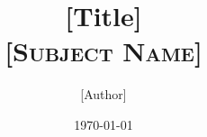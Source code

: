 \documentclass[answers]{exam}
\title{\Huge{[Title]}
	\\
\Large\scshape{[Subject Name]}}
\author{[Author]}
\date{\today}
\begin{document}
\maketitle

\begin{questions}
  
  \newpage
  
\end{questions}

% 
% 
\end{document}

